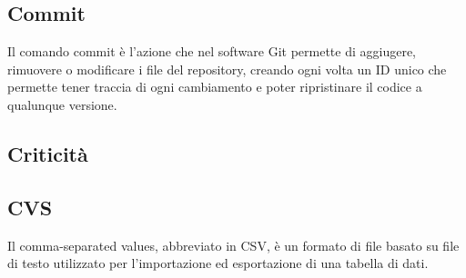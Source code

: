 \subsection*{Commit}
Il comando commit è l'azione che nel software Git permette di aggiugere, rimuovere o modificare i file del repository, creando ogni volta un ID unico che permette tener traccia di ogni cambiamento e poter ripristinare il codice a qualunque versione.

\subsection*{Criticità}

\subsection*{CVS}
Il comma-separated values, abbreviato in CSV, è un formato di file basato su file di testo utilizzato per l'importazione ed esportazione di una tabella di dati.

